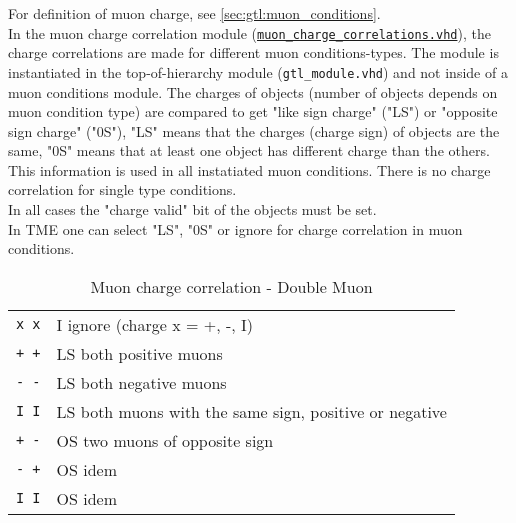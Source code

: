 For definition of muon charge, see \ref{sec:gtl:muon_conditions}.\\
In the muon charge correlation module (\href{https://github.com/cms-l1-globaltrigger/mp7_ugt_legacy/tree/master/firmware/hdl/gt_mp7_core/gtl_fdl_wrapper/gtl/muon_charge_correlations.vhd}{\texttt{muon\_charge\_correlations.vhd}}), the charge correlations are made for different muon conditions-types. The module is instantiated in the top-of-hierarchy module (\texttt{gtl\_module.vhd})
and not inside of a muon conditions module. 
The charges of objects (number of objects depends on muon condition type) are compared to get "like sign charge" ("LS") or "opposite sign charge" ("0S"), "LS" means that the charges (charge sign)
of objects are the same, "0S" means that at least one object has different charge than the others. This information is used in all instatiated muon conditions.
There is no charge correlation for single type conditions.\\
In all cases the "charge valid" bit of the objects must be set.\\
In TME one can select "LS", "0S" or ignore for charge correlation in muon conditions.\\

% 
% 
% 
% 
% 
% 

\begin{table}[ht]
\caption{Muon charge correlation - Double Muon}
\vspace{5mm}
\centering
\begin{tabular}{|c|l|}\hline
\verb|x x| & I ignore (charge x = +, -, I) \\
\verb|+ +| & LS both positive muons \\
\verb|- -| & LS both negative muons \\
\verb|I I| & LS both muons with the same sign, positive or negative \\
\verb|+ -| & OS two muons of opposite sign \\
\verb|- +| & OS idem \\
\verb|I I| & OS idem \\\hline
\end{tabular}
\label{tab:gtl:muon_charge_corr_double}
\end{table}

